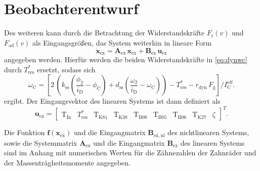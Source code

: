 \chapter{Beobachterentwurf}\label{ch:ch3}


Des weiteren kann durch die Betrachtung der Widerstandskräfte $F_\mathrm{r}(v)$ und $F_\mathrm{ad}(v)$ als Eingangsgrößen, das System weiterhin in lineare Form
\begin{equation}\label{eq:sys_linex}
\dot{\pmb{x}}_\mathrm{ex} = \pmb{A}_\mathrm{ex}\,\pmb{x}_\mathrm{ex} + \pmb{B}_\mathrm{ex}\,\pmb{u}_\mathrm{ex}
\end{equation}
angegeben werden. Hierfür werden die beiden Widerstandskräfte in \eqref{eq:dynwc} durch $T^*_\mathrm{res}$ ersetzt, sodass sich 
\begin{equation}\label{eq:dynwc_lin}
\dot{\omega}_\mathrm{C} = \left[ 2\,\left(k_\mathrm{ss}\left(\frac{\phi_2}{i_{\mathrm{D}}} - \phi_\mathrm{C}\right) + d_\mathrm{ss}\left(\frac{\omega_2}{i_{\mathrm{D}}} - \omega_\mathrm{C}\right)\right) - T^*_\mathrm{res} - r_\mathrm{dyn}\, F_\mathrm{g}\right]/I^\mathrm{eff}_\mathrm{C}.
\end{equation}
 ergibt. Der Eingangsvektor des linearen Systems ist dann definiert als 
\begin{equation}\label{eq:uex}
\pmb{u}_\mathrm{ex} = \begin{bmatrix} \mathrm{T}_{\mathrm{In}} & T^*_\mathrm{res} & \mathrm{T}_{\mathrm{K81}} & \mathrm{T}_{\mathrm{K38}} & \mathrm{T}_{\mathrm{B08}} & \mathrm{T}_{\mathrm{B05}} & \mathrm{T}_{\mathrm{B06}} & \mathrm{T}_{\mathrm{K27}} & \zeta \end{bmatrix}^T.
\end{equation}

Die Funktion $\pmb{f}(\pmb{x}_\mathrm{ex})$ und die Eingangmatrix $\pmb{B}_\mathrm{ex,nl}$ des nichtlinearen Systems, sowie die Systemmatrix $\pmb{A}_\mathrm{ex}$ und die Eingangmatrix $\pmb{B}_\mathrm{ex}$ des linearen Systems sind im Anhang mit numerischen Werten für die Zähnezahlen der Zahnräder und der Massenträgheitsmomente angegeben.

